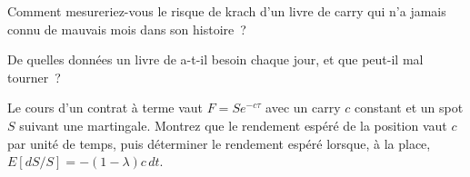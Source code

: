 \begin{interviewq}\label{iq:s1:carry-across-asset-classes:4}
Comment mesureriez-vous le risque de krach d'un livre de carry qui n'a jamais connu de mauvais mois dans son histoire~?
\end{interviewq}

\begin{interviewq}\label{iq:s1:carry-across-asset-classes:5}
De quelles données un livre de  a-t-il besoin chaque jour, et que peut-il mal tourner~?
\end{interviewq}

\begin{interviewq}\label{iq:s1:carry-across-asset-classes:6}
Le cours d'un contrat à terme vaut $F = S e^{-c\tau}$ avec un carry $c$ constant et un spot $S$ suivant une martingale. Montrez que le rendement espéré de la position vaut $c$
par unité de temps, puis déterminer le rendement espéré lorsque, à la place, $E[dS/S] = -(1 - \lambda) c\, dt$.
\end{interviewq}
